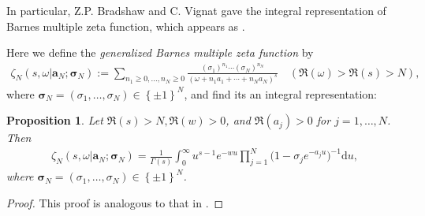 \documentclass[11pt]{article}
\theoremstyle{plain}
\newtheorem{pro}[thm]{Proposition}
\theoremstyle{definition}
\begin{document}
In particular, Z.P. Bradshaw and C. Vignat \cite{BV2024} gave the integral representation of Barnes multiple zeta function, which
appears as \cite[Eq. (3.2)]{R2000}.

Here we define the \emph{generalized Barnes multiple zeta function} by
 \begin{align}
 \zeta _N(s,\omega |\mathbf{a}_N;\boldsymbol{\sigma }_N):=\sum_{n_1\ge 0,...,n_N\ge 0}{\frac{\left( \sigma _1 \right) ^{n_1}\cdots \left( \sigma _N \right) ^{n_N}}{(\omega +n_1a_1+\cdots +n_Na_N)^s}}\quad (\Re (\omega )>\Re (s)>N),\quad
\end{align}
where $\boldsymbol{\sigma }_N=\left( \sigma _1,\ldots ,\sigma _N \right) \in \left\{ \pm 1 \right\} ^N$,
and find its an integral representation:

\begin{pro}
 Let $\Re(s)>N, \Re(w)>0$, and $\Re(a_j)>0$ for $j = 1,\ldots,N$. Then
\begin{align*}
\zeta _N(s,\omega |\mathbf{a}_N;\boldsymbol{\sigma }_N)=\frac{1}{\Gamma \left( s \right)}\int_0^{\infty}{u^{s-1}}e^{-wu}\prod_{j=1}^N{(}1-\sigma _je^{-a_ju})^{-1}\mathrm{d}u,
\end{align*}
where $\boldsymbol{\sigma }_N=\left( \sigma _1,\ldots ,\sigma _N \right) \in \left\{ \pm 1 \right\} ^N$.
\end{pro}
\begin{proof}
This proof is analogous to that in \emph{\cite[Prop. 2]{BV2024}}.
\end{proof}
	
\end{document}

